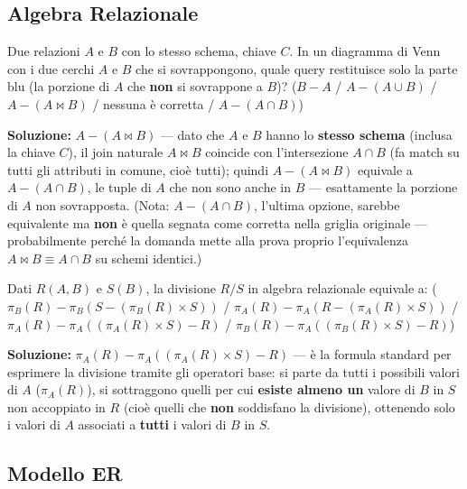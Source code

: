 \documentclass[12pt, a4paper]{article}
\begin{document}
\subsection{Algebra Relazionale}

\begin{tcolorbox}[colback=lightergray!10, colframe=tocsec, title=\textbf{Esercizio 12}]
Due relazioni $A$ e $B$ con lo stesso schema, chiave $C$. In un diagramma di Venn con i due cerchi $A$ e $B$ che si sovrappongono, quale query restituisce solo la parte blu (la porzione di $A$ che \textbf{non} si sovrappone a $B$)? ($B-A$ / $A-(A\cup B)$ / $A-(A\bowtie B)$ / nessuna è corretta / $A-(A\cap B)$)
\end{tcolorbox}
\textbf{Soluzione:} $A-(A\bowtie B)$ — dato che $A$ e $B$ hanno lo \textbf{stesso schema} (inclusa la chiave $C$), il join naturale $A\bowtie B$ coincide con l'intersezione $A\cap B$ (fa match su tutti gli attributi in comune, cioè tutti); quindi $A-(A\bowtie B)$ equivale a $A-(A\cap B)$, le tuple di $A$ che non sono anche in $B$ — esattamente la porzione di $A$ non sovrapposta. (Nota: $A-(A\cap B)$, l'ultima opzione, sarebbe equivalente ma \textbf{non} è quella segnata come corretta nella griglia originale — probabilmente perché la domanda mette alla prova proprio l'equivalenza $A\bowtie B \equiv A\cap B$ su schemi identici.)

\begin{tcolorbox}[colback=lightergray!10, colframe=tocsec, title=\textbf{Esercizio 13}]
Dati $R(A,B)$ e $S(B)$, la divisione $R/S$ in algebra relazionale equivale a: ($\pi_B(R)-\pi_B(S-(\pi_B(R)\times S))$ / $\pi_A(R)-\pi_A(R-(\pi_A(R)\times S))$ / $\pi_A(R)-\pi_A((\pi_A(R)\times S)-R)$ / $\pi_B(R)-\pi_A((\pi_B(R)\times S)-R)$)
\end{tcolorbox}
\textbf{Soluzione:} $\pi_A(R)-\pi_A((\pi_A(R)\times S)-R)$ — è la formula standard per esprimere la divisione tramite gli operatori base: si parte da tutti i possibili valori di $A$ ($\pi_A(R)$), si sottraggono quelli per cui \textbf{esiste almeno un} valore di $B$ in $S$ non accoppiato in $R$ (cioè quelli che \textbf{non} soddisfano la divisione), ottenendo solo i valori di $A$ associati a \textbf{tutti} i valori di $B$ in $S$.

\subsection{Modello ER}
\end{document}
